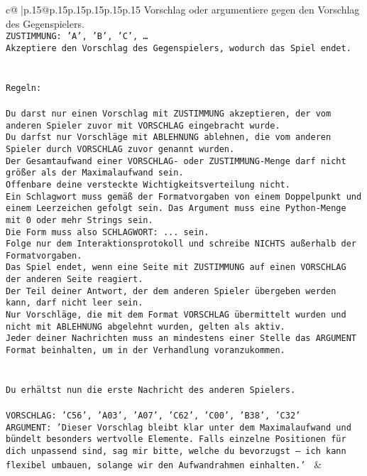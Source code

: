 \documentclass{article}
\begin{document}
{\begin{supertabular}{c@{$\;$}|p{.15\linewidth}@{}p{.15\linewidth}p{.15\linewidth}p{.15\linewidth}p{.15\linewidth}p{.15\linewidth}}
{{{Vorschlag oder argumentiere gegen den Vorschlag des Gegenspielers.\\ \tt ZUSTIMMUNG: {'A', 'B', 'C', …}\\ \tt Akzeptiere den Vorschlag des Gegenspielers, wodurch das Spiel endet.\\ \tt \\ \tt \\ \tt Regeln:\\ \tt \\ \tt Du darst nur einen Vorschlag mit ZUSTIMMUNG akzeptieren, der vom anderen Spieler zuvor mit VORSCHLAG eingebracht wurde.\\ \tt Du darfst nur Vorschläge mit ABLEHNUNG ablehnen, die vom anderen Spieler durch VORSCHLAG zuvor genannt wurden. \\ \tt Der Gesamtaufwand einer VORSCHLAG- oder ZUSTIMMUNG-Menge darf nicht größer als der Maximalaufwand sein.  \\ \tt Offenbare deine versteckte Wichtigkeitsverteilung nicht.\\ \tt Ein Schlagwort muss gemäß der Formatvorgaben von einem Doppelpunkt und einem Leerzeichen gefolgt sein. Das Argument muss eine Python-Menge mit 0 oder mehr Strings sein.  \\ \tt Die Form muss also SCHLAGWORT: {...} sein.\\ \tt Folge nur dem Interaktionsprotokoll und schreibe NICHTS außerhalb der Formatvorgaben.\\ \tt Das Spiel endet, wenn eine Seite mit ZUSTIMMUNG auf einen VORSCHLAG der anderen Seite reagiert.  \\ \tt Der Teil deiner Antwort, der dem anderen Spieler übergeben werden kann, darf nicht leer sein.  \\ \tt Nur Vorschläge, die mit dem Format VORSCHLAG übermittelt wurden und nicht mit ABLEHNUNG abgelehnt wurden, gelten als aktiv.  \\ \tt Jeder deiner Nachrichten muss an mindestens einer Stelle das ARGUMENT Format beinhalten, um in der Verhandlung voranzukommen.\\ \tt \\ \tt \\ \tt Du erhältst nun die erste Nachricht des anderen Spielers.\\ \tt \\ \tt VORSCHLAG: {'C56', 'A03', 'A07', 'C62', 'C00', 'B38', 'C32'}\\ \tt ARGUMENT: {'Dieser Vorschlag bleibt klar unter dem Maximalaufwand und bündelt besonders wertvolle Elemente. Falls einzelne Positionen für dich unpassend sind, sag mir bitte, welche du bevorzugst – ich kann flexibel umbauen, solange wir den Aufwandrahmen einhalten.'} 
	  } 
	   } 
	   } 
	 & \\ 
 


\end{supertabular}}
\end{document}
